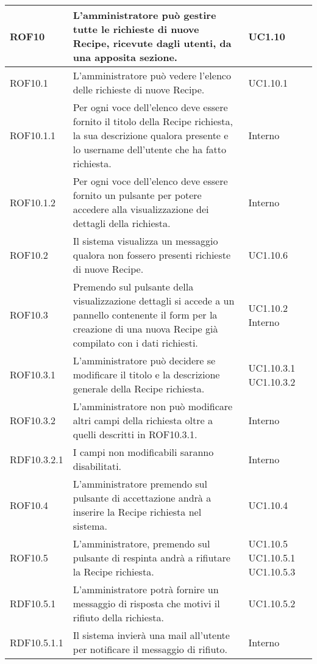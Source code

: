 \begin{center}
\begin{longtable}{| p{2.5cm} | p{8cm} | p{2cm} |}

		ROF10  &  L'amministratore può gestire tutte le richieste di nuove Recipe, ricevute dagli utenti, da una apposita sezione.  & UC1.10 \\
		\hline
		ROF10.1  &  L'amministratore può vedere l'elenco delle richieste di nuove Recipe.  & UC1.10.1 \\
		\hline
		ROF10.1.1  &  Per ogni voce dell'elenco deve essere fornito il titolo della Recipe richiesta, la sua descrizione qualora presente e lo username dell'utente che ha fatto richiesta.  & Interno \\
		\hline
		ROF10.1.2  &  Per ogni voce dell'elenco deve essere fornito un pulsante per potere accedere alla visualizzazione dei dettagli della richiesta.  & Interno \\
		\hline
		ROF10.2  &  Il sistema visualizza un messaggio qualora non fossero presenti richieste di nuove Recipe.  & UC1.10.6 \\
		\hline
		ROF10.3  &  Premendo sul pulsante della visualizzazione dettagli si accede a un pannello contenente il form per la creazione di una nuova Recipe già compilato con i dati richiesti.  &  UC1.10.2 \newline Interno \\
		\hline
		ROF10.3.1  &  L'amministratore può decidere se modificare il titolo e la descrizione generale della Recipe richiesta.  & UC1.10.3.1 \newline UC1.10.3.2 \\
		\hline
		ROF10.3.2  &  L'amministratore non può modificare altri campi della richiesta oltre a quelli descritti in ROF10.3.1.  & Interno \\
		\hline
		RDF10.3.2.1  &  I campi non modificabili saranno disabilitati.  & Interno \\
		\hline
		ROF10.4  &  L'amministratore premendo sul pulsante di accettazione andrà a inserire la Recipe richiesta nel sistema.  & UC1.10.4 \\
		\hline
		ROF10.5  &  L'amministratore, premendo sul pulsante di respinta andrà a rifiutare la Recipe richiesta.  & UC1.10.5 \newline UC1.10.5.1 \newline UC1.10.5.3 \\
		\hline
		RDF10.5.1  &  L'amministratore potrà fornire un messaggio di risposta che motivi il rifiuto della richiesta.  & UC1.10.5.2 \\
		\hline
		RDF10.5.1.1  &  Il sistema invierà una mail all'utente per notificare il messaggio di rifiuto.  &  Interno \\
		\hline


\end{longtable}
\end{center}
